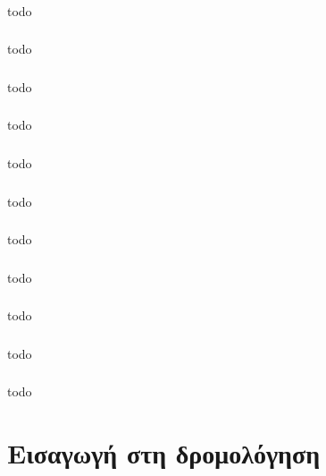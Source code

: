 \documentclass[a4paper, 12pt]{article}
\begin{document}
		\subsubsection{}
			todo

		\subsubsection{}
			todo

		\subsubsection{}
			todo

		\subsubsection{}
			todo

		\subsubsection{}
			todo

		\subsubsection{}
			todo

		\subsubsection{}
			todo

		\subsubsection{}
			todo

		\subsubsection{}
			todo

		\subsubsection{}
			todo

		\subsubsection{}
			todo

\section{Εισαγωγή στη δρομολόγηση}
\end{document}
